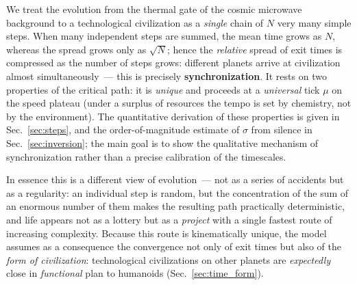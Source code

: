 \documentclass[11pt,a4paper]{article}
\begin{document}
We treat the evolution from the thermal gate of the cosmic microwave background to a technological civilization as a \emph{single} chain of $N$ very many simple steps. When many independent steps are summed, the mean time grows as $N$, whereas the spread grows only as $\sqrt{N}$; hence the \emph{relative} spread of exit times is compressed as the number of steps grows: different planets arrive at civilization almost simultaneously~--- this is precisely \textbf{synchronization}. It rests on two properties of the critical path: it is \emph{unique} and proceeds at a \emph{universal} tick $\mu$ on the speed plateau (under a surplus of resources the tempo is set by chemistry, not by the environment). The quantitative derivation of these properties is given in Sec.~\ref{sec:steps}, and the order-of-magnitude estimate of $\sigma$ from silence in Sec.~\ref{sec:inversion}; the main goal is to show the qualitative mechanism of synchronization rather than a precise calibration of the timescales.

In essence this is a different view of evolution~--- not as a series of accidents but as a regularity: an individual step is random, but the concentration of the sum of an enormous number of them makes the resulting path practically deterministic, and life appears not as a lottery but as a \emph{project} with a single fastest route of increasing complexity. Because this route is kinematically unique, the model assumes as a consequence the convergence not only of exit times but also of the \emph{form of civilization}: technological civilizations on other planets are \emph{expectedly} close in \emph{functional} plan to humanoids (Sec.~\ref{sec:time_form}).
\end{document}
